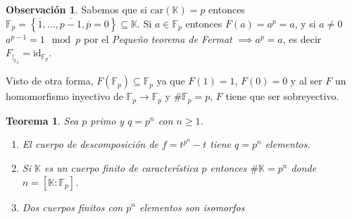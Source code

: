 \documentclass[10pt, spanish]{report}
\newtheorem*{tma}{Teorema}
\theoremstyle{definition}
\newtheorem*{obs}{Observación}
\newcommand{\F}{\mathbb{F}}
\newcommand{\K}{\mathbb{K}}
\newcommand{\id}{\text{id}}
\newcommand{\car}[1]{\text{car}(#1)}
\renewcommand{\geq}{\geqslant}
\newcommand{\fecha}[1]{\marginpar{\underline{#1}}}
\begin{document}
\fecha{15/03}
\begin{obs}
    Sabemos que si $\car{\K}=p$ entonces $\F_p=\left\{
    \overline{1},\ldots,\overline{p-1},\overline{p}=0\right\}\subseteq\K$. Si
    $a\in\F_p$ entonces $F(a)=a^p=a$, y si $a\neq0$ $a^{p-1}=1\mod p$ por el
    \textit{Pequeño teorema de Fermat} $\implies a^p=a$, es decir $F_{|_{\F_p}}=
    \id_{\F_p}$.

    Visto de otra forma, $F(\F_p)\subseteq\F_p$ ya que $F(1)=1$, $F(0)=0$ y al
    ser $F$ un homomorfismo inyectivo de $\F_p\to\F_p$ y $\#\F_p=p$, $F$ tiene
    que ser sobreyectivo.
\end{obs}

\begin{tma}
    Sea $p$ primo y $q=p^n$ con $n\geq1$.
    \begin{enumerate}
        \item El cuerpo de descomposición de $f=t^{p^n}-t$ tiene $q=p^n$
            elementos.
        \item  Si $\K$ es un cuerpo finito de característica $p$ entonces
            $\#\K=p^n$ donde $n=\left[ \K:\F_p \right]$.
        \item Dos cuerpos finitos con $p^n$ elementos son isomorfos
    \end{enumerate}
\end{tma}
\end{document}
